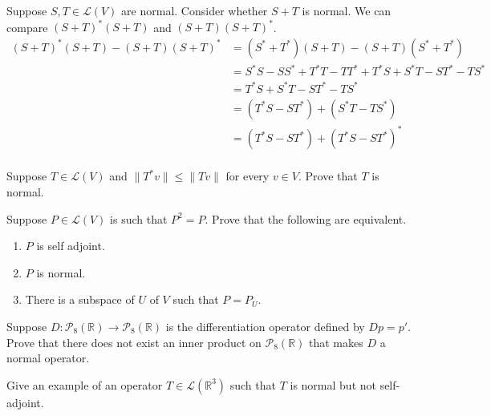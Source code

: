 \documentclass[12 pt, letterpaper]{hmcpset}
\begin{document}
\begin{solution}
	Suppose $S, T \in \mathcal{L}(V)$ are normal. Consider whether $S + T$ is normal. We can compare $(S + T)^{*} (S + T)$ and $(S + T) (S + T)^{*}$.
	\begin{align*}
		(S + T)^{*} (S + T) - (S + T) (S + T)^{*} & = (S^{*} + T^{*}) (S + T) - (S + T)(S^{*} + T^{*}) \\
							  & = S^{*} S - S S^{*} + T^{*} T - T T^{*} + T^{*} S + S^{*} T - S T^{*} - T S^{*} \\
							  & = T^{*} S + S^{*} T - S T^{*} - T S^{*} \\
							  & = (T^{*} S - S T^{*}) + (S^{*} T - T S^{*}) \\
							  & = (T^{*} S - S T^{*}) + (T^{*} S - S T^{*})^{*} \\
	\end{align*} 
\end{solution}

\pagebreak

\begin{problem}[19]
	Suppose $T \in \mathcal{L}(V)$ and $\lVert T^{*} v \rVert \le \lVert Tv \rVert$ for every $v \in V$. Prove that $T$ is normal.
\end{problem}

\pagebreak

\begin{problem}[20]
	Suppose $P \in \mathcal{L}(V)$ is such that $P^{2} = P$. Prove that the following are equivalent.
	\begin{enumerate}
		\item $P$ is self adjoint.
		\item $P$ is normal.
		\item There is a subspace of $U$ of $V$ such that $P = P_{U}$.
	\end{enumerate}
\end{problem}

\pagebreak

\begin{problem}[21]
	Suppose $D: \mathcal{P}_{8}(\mathbb{R}) \to \mathcal{P}_{8}(\mathbb{R})$ is the differentiation operator defined by $Dp = p'$. Prove that there does not exist an inner product on $\mathcal{P}_{8}(\mathbb{R})$ that makes $D$ a normal operator.
\end{problem}

\pagebreak

\begin{problem}[22]
	Give an example of an operator $T \in \mathcal{L}(\mathbb{R}^{3})$ such that $T$ is normal but not self-adjoint.
\end{problem}
\end{document}
